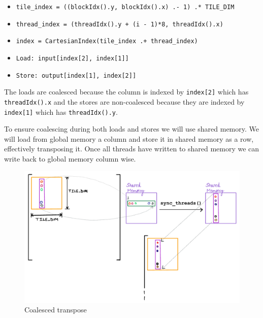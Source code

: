 \documentclass[12pt,a4paper]{article}
\begin{document}
\begin{itemize}
\item \texttt{tile\_index = ((blockIdx().y, blockIdx().x) .- 1) .* TILE\_DIM}


\item \texttt{thread\_index = (threadIdx().y + (i - 1)*8, threadIdx().x)}


\item \texttt{index = CartesianIndex(tile\_index .+ thread\_index)}


\item \texttt{Load: input[index[2], index[1]]}


\item \texttt{Store: output[index[1], index[2]]}

\end{itemize}
The loads are coalesced because the column is indexed by \texttt{index[2]} which has \texttt{threadIdx().x} and the stores are non-coalesced because they are indexed by \texttt{index[1]} which has \texttt{threadIdx().y}.

To ensure coalescing during both loads and stores we will use shared memory. We will load from global memory a column and store it in shared memory as a row, effectively transposing it. Once all threads have written to shared memory we can write back to global memory column wise.

\begin{figure}
\centering
\includegraphics{./assets/coalesced_transpose.png}
\caption{Coalesced transpose}
\end{figure}
\end{document}

